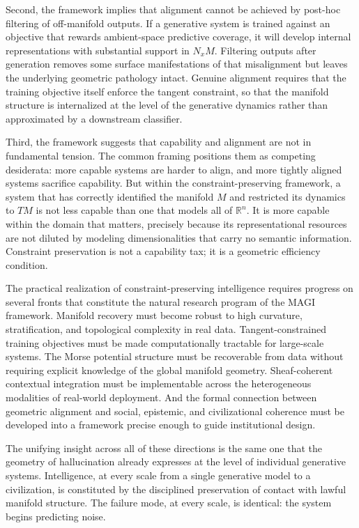 \documentclass[11pt,a4paper,twocolumn]{article}
\begin{document}
Second, the framework implies that alignment cannot be
achieved by post-hoc filtering of off-manifold outputs.
If a generative system is trained against an objective
that rewards ambient-space predictive coverage, it will
develop internal representations with substantial support
in $N_x M$. Filtering outputs after generation removes
some surface manifestations of that misalignment but
leaves the underlying geometric pathology intact. Genuine
alignment requires that the training objective itself
enforce the tangent constraint, so that the manifold
structure is internalized at the level of the generative
dynamics rather than approximated by a downstream
classifier.

Third, the framework suggests that capability and
alignment are not in fundamental tension. The common
framing positions them as competing desiderata: more
capable systems are harder to align, and more tightly
aligned systems sacrifice capability. But within the
constraint-preserving framework, a system that has
correctly identified the manifold $M$ and restricted
its dynamics to $TM$ is not less capable than one
that models all of $\mathbb{R}^n$. It is more capable
within the domain that matters, precisely because its
representational resources are not diluted by modeling
dimensionalities that carry no semantic information.
Constraint preservation is not a capability tax; it is
a geometric efficiency condition.

The practical realization of constraint-preserving
intelligence requires progress on several fronts that
constitute the natural research program of the MAGI
framework. Manifold recovery must become robust to
high curvature, stratification, and topological
complexity in real data. Tangent-constrained training
objectives must be made computationally tractable for
large-scale systems. The Morse potential structure
must be recoverable from data without requiring
explicit knowledge of the global manifold geometry.
Sheaf-coherent contextual integration must be
implementable across the heterogeneous modalities of
real-world deployment. And the formal connection
between geometric alignment and social, epistemic,
and civilizational coherence must be developed into
a framework precise enough to guide institutional
design.

The unifying insight across all of these directions
is the same one that the geometry of hallucination
already expresses at the level of individual generative
systems. Intelligence, at every scale from a single
generative model to a civilization, is constituted by
the disciplined preservation of contact with lawful
manifold structure. The failure mode, at every scale,
is identical: the system begins predicting noise.
\end{document}
